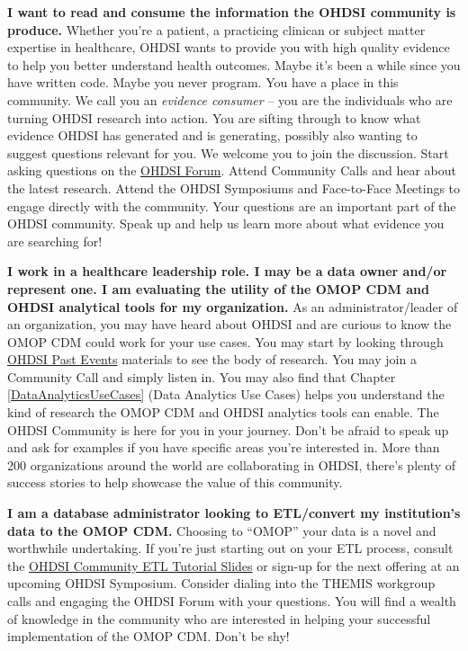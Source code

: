 \documentclass[11pt]{book}
\theoremstyle{definition}
\theoremstyle{definition}
\theoremstyle{definition}
\theoremstyle{remark}
\begin{document}
\textbf{I want to read and consume the information the OHDSI community is produce.} Whether you're a patient, a practicing clinican or subject matter expertise in healthcare, OHDSI wants to provide you with high quality evidence to help you better understand health outcomes. Maybe it's been a while since you have written code. Maybe you never program. You have a place in this community. We call you an \emph{evidence consumer} -- you are the individuals who are turning OHDSI research into action. You are sifting through to know what evidence OHDSI has generated and is generating, possibly also wanting to suggest questions relevant for you. We welcome you to join the discussion. Start asking questions on the \href{http://forum.ohdsi.org}{OHDSI Forum}. Attend Community Calls and hear about the latest research. Attend the OHDSI Symposiums and Face-to-Face Meetings to engage directly with the community. Your questions are an important part of the OHDSI community. Speak up and help us learn more about what evidence you are searching for!

\textbf{I work in a healthcare leadership role. I may be a data owner and/or represent one. I am evaluating the utility of the OMOP CDM and OHDSI analytical tools for my organization.} As an administrator/leader of an organization, you may have heard about OHDSI and are curious to know the OMOP CDM could work for your use cases. You may start by looking through \href{https://www.ohdsi.org/past-events/}{OHDSI Past Events} materials to see the body of research. You may join a Community Call and simply listen in. You may also find that Chapter \ref{DataAnalyticsUseCases} (Data Analytics Use Cases) helps you understand the kind of research the OMOP CDM and OHDSI analytics tools can enable. The OHDSI Community is here for you in your journey. Don't be afraid to speak up and ask for examples if you have specific areas you're interested in. More than 200 organizations around the world are collaborating in OHDSI, there's plenty of success stories to help showcase the value of this community.

\textbf{I am a database administrator looking to ETL/convert my institution's data to the OMOP CDM.} Choosing to ``OMOP'' your data is a novel and worthwhile undertaking. If you're just starting out on your ETL process, consult the \href{https://www.ohdsi-europe.org/images/symposium-2019/tutorials/OHDSI_Vocabulary_CDM_Tutorial.pdf}{OHDSI Community ETL Tutorial Slides} or sign-up for the next offering at an upcoming OHDSI Symposium. Consider dialing into the THEMIS workgroup calls and engaging the OHDSI Forum with your questions. You will find a wealth of knowledge in the community who are interested in helping your successful implementation of the OMOP CDM. Don't be shy!
\end{document}

